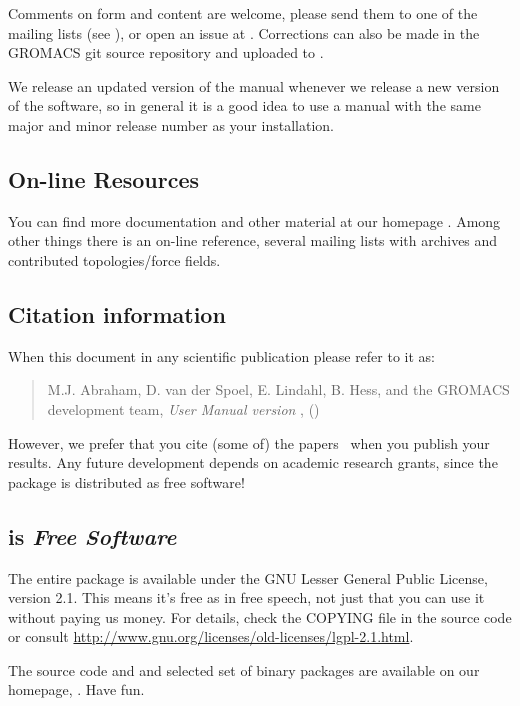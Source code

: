 \documentclass[11pt,a4paper,twoside]{gmxmanual}
\begin{document}
{Comments on form and content are welcome, please send them to one of
the mailing lists (see {\wwwpage}), or open an issue
at {\redminepage}. Corrections can also be made in the GROMACS git
source repository and uploaded to {\gerritpage}.

We release an updated version of the manual whenever
we release a new version of the software, so in general 
it is a good idea to use a manual with the same major and
minor release number as your {\gromacs} installation. 

\subsection*{On-line Resources}
You can find more documentation and other material at our homepage
\wwwpage. Among other things there is an on-line reference, several
{\gromacs} mailing lists with archives and contributed
topologies/force fields.

\subsection*{Citation information}
When  this document in any scientific publication
please refer to it as:
\begin{quote}
\raggedright
M.J. Abraham, D. van der Spoel, E. Lindahl, B. Hess, and the GROMACS development team,
\hspace{0.3em} {\em {\gromacs} {U}ser {M}anual version \gmxver},
\hspace{0.3em} {\wwwpage} ({\gmxyear})
\end{quote}
However, we prefer that you cite (some of) the {\gromacs}
papers~\cite{Bekker93a,Berendsen95a,Lindahl2001a,Spoel2005a,Hess2008b,Pronk2013}
when you publish your results. Any future development depends on academic research
grants, since the package is distributed as free software!

\subsection*{{\gromacs} is {\em Free Software}}
The entire {\gromacs} package is available under the GNU Lesser
General Public License, version 2.1. This means it's free as in free
speech, not just that you can use it without paying us money. For
details, check the COPYING file in the source code or consult
\href{http://www.gnu.org/licenses/old-licenses/lgpl-2.1.html}{http://www.gnu.org/licenses/old-licenses/lgpl-2.1.html}.

The {\gromacs} source code and and selected set of binary packages are
available on our homepage, \wwwpage. Have fun.
} %
\end{document}

